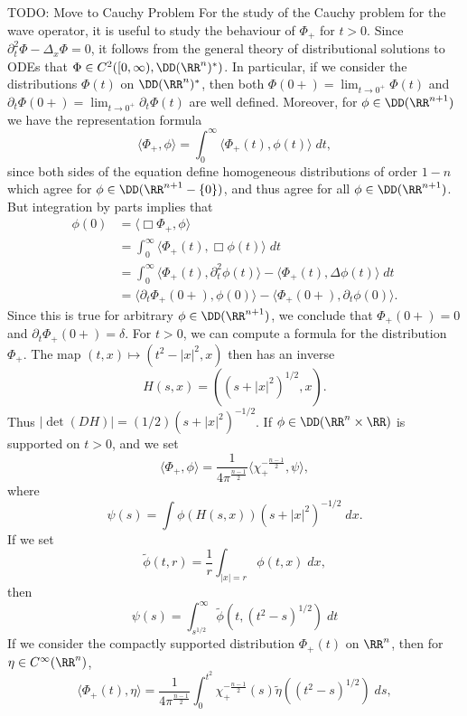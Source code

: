 \begin{example}
    TODO: Move to Cauchy Problem For the study of the Cauchy problem for the wave operator, it is useful to study the behaviour of $\Phi_+$ for $t > 0$. Since $\partial_t^2 \Phi - \Delta_x \Phi = 0$, it follows from the general theory of distributional solutions to ODEs that $\Phi \in C^2([0,\infty), \DD(\RR^n)^*)$. In particular, if we consider the distributions $\Phi(t)$ on $\DD(\RR^n)^*$, then both $\Phi(0+) = \lim_{t \to 0^+} \Phi(t)$ and $\partial_t \Phi(0+) = \lim_{t \to 0^+} \partial_t \Phi(t)$ are well defined. Moreover, for $\phi \in \DD(\RR^{n+1})$ we have the representation formula
    \[ \langle \Phi_+, \phi \rangle = \int_0^\infty \langle \Phi_+(t), \phi(t) \rangle\; dt, \]
    since both sides of the equation define homogeneous distributions of order $1-n$ which agree for $\phi \in \DD(\RR^{n+1} - \{ 0 \})$, and thus agree for all $\phi \in \DD(\RR^{n+1})$. But integration by parts implies that
    \begin{align*}
        \phi(0) &= \langle \Box \Phi_+, \phi \rangle\\
        &= \int_0^\infty \langle \Phi_+(t), \Box \phi(t) \rangle\; dt\\
        &= \int_0^\infty \langle \Phi_+(t), \partial_t^2 \phi(t) \rangle - \langle \Phi_+(t), \Delta \phi(t) \rangle\; dt\\
        &= \langle \partial_t \Phi_+(0+), \phi(0) \rangle - \langle \Phi_+(0+), \partial_t \phi(0) \rangle.
    \end{align*}
    Since this is true for arbitrary $\phi \in \DD(\RR^{n+1})$, we conclude that $\Phi_+(0+) = 0$ and $\partial_t \Phi_+(0+) = \delta$. For $t > 0$, we can compute a formula for the distribution $\Phi_+$. The map $(t,x) \mapsto (t^2 - |x|^2, x)$ then has an inverse
    \[ H(s,x) = ( (s + |x|^2)^{1/2} , x). \]
    Thus $|\det(DH)| = (1/2) (s + |x|^2)^{-1/2}$. If $\phi \in \DD(\RR^n \times \RR)$ is supported on $t > 0$, and we set
    \[ \langle \Phi_+, \phi \rangle = \frac{1}{4 \pi^{\frac{n-1}{2}}} \langle \chi_+^{- \frac{n-1}{2}}, \psi \rangle, \]
    where
    \[ \psi(s) = \int \phi(H(s,x)) (s + |x|^2)^{-1/2}\; dx. \]
    If we set
    \[ \tilde{\phi}(t,r) = \frac{1}{r} \int_{|x| = r} \phi(t, x)\; dx, \]
    then
    \[ \psi(s) = \int_{s^{1/2}}^\infty \tilde{\phi}(t, (t^2 - s)^{1/2})\; dt \]
    If we consider the compactly supported distribution $\Phi_+(t)$ on $\RR^n$, then for $\eta \in C^\infty(\RR^n)$,
    \[ \langle \Phi_+(t), \eta \rangle = \frac{1}{4 \pi^{\frac{n-1}{2}}} \int_0^{t^2} \chi_+^{-\frac{n-1}{2}}(s) \tilde{\eta}((t^2 - s)^{1/2})\; ds, \]

\end{example}
